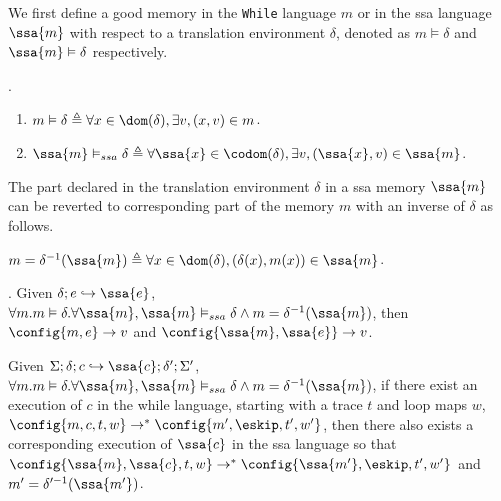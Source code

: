 {
We first define a good memory in the {\tt While} language $m$ or in the ssa language $\ssa{m}$ with respect to a translation environment $\delta$, denoted as $m \vDash \delta$ and $\ssa{m} \vDash \delta$ respectively. 
%
\begin{defn}.
\begin{enumerate}
    \item $ m \vDash \delta  \triangleq \forall x \in \dom(\delta), \exists v, (x,v) \in m$.
    \item $ \ssa{m} \vDash_{ssa} \delta  \triangleq \forall \ssa{x} \in \codom(\delta), \exists v, (\ssa{x},v) \in \ssa{m}$.
\end{enumerate}
\end{defn}
%
The part declared in the translation environment $\delta$ in a ssa memory $\ssa{m}$ can be reverted to corresponding part of the memory $m$ with an inverse of $\delta$ as follows.
%
\begin{defn}
 $m = \delta^{-1}(\ssa{m}) \triangleq \forall x \in \dom(\delta), (\delta(x), m(x)) \in \ssa{m} $.
\end{defn}
}
%
\begin{lem}.
\label{lem:same_value}
{
Given $\delta; e \hookrightarrow \ssa{e}$,  $\forall m. m \vDash \delta. \forall \ssa{m}, \ssa{m} \vDash_{ssa} \delta \land m = \delta^{-1}(\ssa{m})$, then $\config{m, e} \to v $ and $\config{
\ssa{m}, \ssa{e}} \to {v}$.
}
\end{lem}

\begin{thm}
Given $\Sigma; \delta ; c \hookrightarrow \ssa{c} ; \delta';\Sigma' $, $\forall m. m \vDash \delta. \forall \ssa{m}, \ssa{m} \vDash_{ssa} \delta \land m = \delta^{-1}(\ssa{m})$, if there exist an execution of $c$ in the while language, starting with a trace $t$ and loop maps $w$, $\config{m, c, t, w} \to^{*} \config{m', \eskip, t', w' } $,  then there also exists a corresponding execution of $\ssa{c}$ in the ssa language so that 
  $\config{  {\ssa{m}}, \ssa{c}, t, w} \to^{*} \config{{  \ssa{m'}}, \eskip, t', w' } $ and $ m' = \delta'^{-1}(\ssa{m'}) $.
\end{thm}

